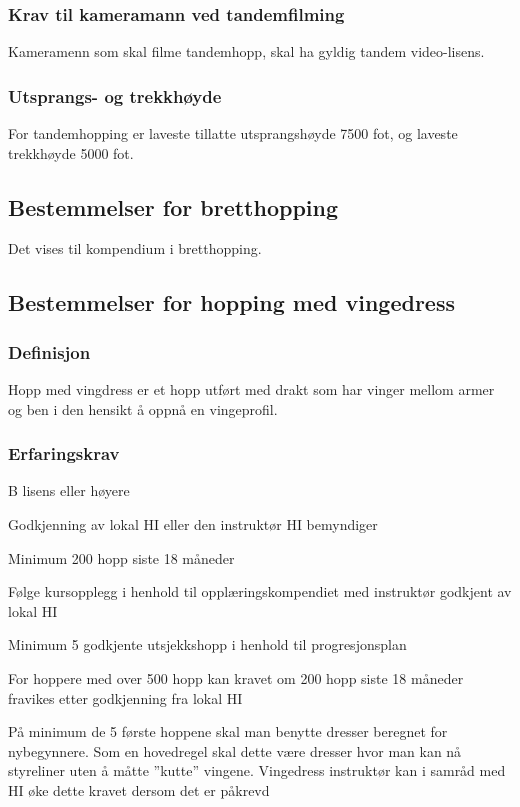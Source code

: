 \subsubsection{Krav til kameramann ved tandemfilming}
Kameramenn som skal filme tandemhopp, skal ha gyldig tandem video-lisens.

\subsubsection{Utsprangs- og trekkhøyde}
For tandemhopping er laveste tillatte utsprangshøyde 7500 fot, og laveste trekkhøyde 5000 fot.

\subsection{Bestemmelser for bretthopping}
Det vises til kompendium i bretthopping.

\subsection{Bestemmelser for hopping med vingedress}
\subsubsection{Definisjon}
Hopp med vingdress er et hopp utført med drakt som har vinger mellom armer og ben i den hensikt å oppnå en vingeprofil.

\subsubsection{Erfaringskrav}
B lisens eller høyere

Godkjenning av lokal HI eller den instruktør HI bemyndiger

Minimum 200 hopp siste 18 måneder

Følge kursopplegg i henhold til opplæringskompendiet med instruktør godkjent av lokal HI

Minimum 5 godkjente utsjekkshopp i henhold til progresjonsplan

For hoppere med over 500 hopp kan kravet om 200 hopp siste 18 måneder fravikes etter godkjenning fra lokal HI

På minimum de 5 første hoppene skal man benytte dresser beregnet for nybegynnere. Som en hovedregel skal dette være dresser hvor man kan nå styreliner uten å måtte ”kutte” vingene. Vingedress instruktør kan i samråd med HI øke dette kravet dersom det er påkrevd

